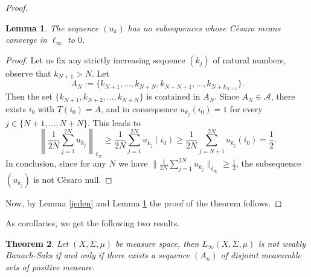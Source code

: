 \documentclass[11pt, reqno]{amsart}
\newtheorem{thm}{Theorem}[section]
\newtheorem{lemma}[thm]{Lemma}
\begin{document}
\begin{proof}
\begin{lemma}\label{dwa}
    The sequence $(u_k)$ has no subsequences whose Cèsaro means converge in $\ell_\infty$ to $0$. 
\end{lemma}

\begin{proof}
        Let us fix any strictly increasing sequence $(k_j)$ of natural numbers,
    observe that $k_{N+1}>N$. Let 
    \[
    A_N:=\{k_{N+1},...,k_{N+N},k_{N+N+1},...,k_{{N+k_{N+1}}}\}.
    \]
    Then the set $\{k_{N+1}, k_{N+2},..., k_{N+N}\}$ is contained in $A_N$. Since $A_N \in \mathcal{A}$, there exists $i_0$ with $T(i_0)=A$, and in consequence $u_{k_j}(i_0)=1$ for every $j\in\{N+1,...,N+N\}$. This leads to
    $$
    \left\| \frac{1}{2 N} \sum_{j=1}^{2N} u_{k_j}\right\|_{\ell_\infty}\geq\frac{1}{2 N} \sum_{j=1}^{2N} u_{k_j}(i_0)\geq \frac{1}{2 N} \sum_{j=N+1}^{2N} u_{k_j}(i_0)=\frac{1}{2}.
    $$
    In conclusion, since for any $N$ we have $\lVert \frac{1}{2 N} \sum_{j=1}^{2N} u_{k_j}\rVert_{\ell_\infty}\geq \frac{1}{2}$, the subsequence $(u_{k_j})$ is not Cèsaro null.
\end{proof}
Now, by Lemma \ref{jeden} and Lemma \ref{dwa} the proof of the theorem follows.
\end{proof}
As corollaries, we get the following two results.
\begin{thm} Let $(X,\Sigma,\mu)$ be measure space, then $L_\infty(X,\Sigma,\mu)$ is not weakly Banach-Saks if and only if there exists a sequence $(A_n)$ of disjoint measurable sets of positive measure.
\end{thm}
\end{document}
